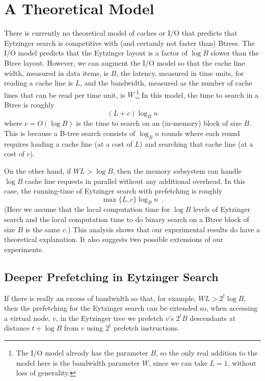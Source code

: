 \documentclass{patmorin}
\begin{document}
\section{A Theoretical Model}

There is currently no theoretical model of caches or I/O that predicts
that Eytzinger search is competitive with (and certainly not faster than)
Btrees.  The I/O model \cite{aggarwal.vitter:input} predicts that the
Eytzinger layout is a factor of $\log B$ slower than the Btree layout.
However, we can augment the I/O model so that the cache line width,
measured in data items, is $B$, the latency, measured in time units, for
reading a cache line is $L$, and the bandwidth, measured as the number
of cache lines that can be read per time unit, is $W$.\footnote{The I/O
model already has the parameter $B$, so the only real addition to the
model here is the bandwidth parameter $W$, since we can take $L=1$,
without loss of generality.}  In this model, the time to search in a
Btree is roughly
\[
     (L+c)\log_B n
\]
where $c=O(\log B)$ is the time to search on an (in-memory) block
of size $B$.  This is because a B-tree search consists of $\log_B n$
rounds where each round requires loading a cache line (at a cost of $L$)
and searching that cache line (at a cost of $c$).

On the other hand, if $WL > \log B$, then the memory subsystem can
handle $\log B$ cache line requests in parallel without any additional
overhead. In this case, the running-time of Eytzinger search with
prefetching is roughly
\[
    \max\{L,c\}\log_B n \enspace .
\]
(Here we assume that the local computation time for $\log B$ levels of
Eytzinger search and the local computation time to do binary
search on a Btree block of size $B$ is the same $c$.)  This analysis
shows that our experimental results do have a theoretical explanation.
It also suggests two possible extensions of our experiments.

\subsection{Deeper Prefetching in Eytzinger Search}

If there is really an excess of bandwidth so that, for example, $WL >
2^t\log B$, then the prefetching for the Eytzinger search can be extended
so, when accessing a virtual node, $v$, in the Eytzinger tree we prefetch
$v$'s $2^tB$ descendants at distance $t+\log B$ from $v$ using $2^t$
prefetch instructions.
\end{document}
